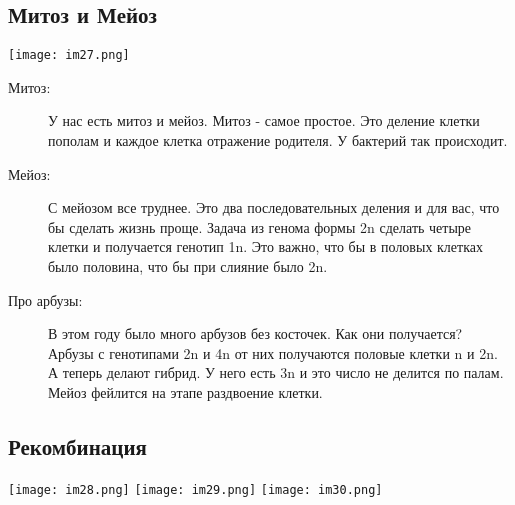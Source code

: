 \subsection{Митоз и Мейоз}
\texttt{[image: im27.png]}

\begin{description}
\item[Митоз:] 
У нас есть митоз и мейоз. Митоз - самое простое. Это 
деление клетки пополам и каждое клетка 
отражение родителя. У бактерий так происходит. 

\item[Мейоз:]
С мейозом все труднее. Это два последовательных деления и для вас, 
что бы сделать жизнь проще. Задача из генома формы 2n 
сделать четыре клетки и получается генотип 1n. Это
важно, что бы в половых клетках было половина, что
бы при слияние было 2n.

\item[Про арбузы:] 
В этом году было много арбузов без косточек.
Как они получается? Арбузы с генотипами 2n и 4n от
них получаются половые клетки n и 2n. А теперь
делают гибрид. У него есть 3n и это число не делится по палам.
Мейоз фейлится на этапе раздвоение клетки.  
\end{description}

\subsection{Рекомбинация}
\texttt{[image: im28.png]}
\texttt{[image: im29.png]}
\texttt{[image: im30.png]}

